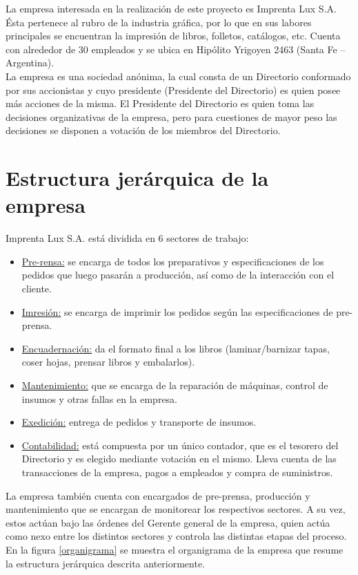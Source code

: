 \documentclass[a4paper, 12pt,twoside]{report}  %
\numberwithin{equation}{subsection} %
\begin{document}
La empresa interesada en la realización de este proyecto es Imprenta Lux S.A. Ésta pertenece al rubro de la industria gráfica, por lo que en sus labores principales se encuentran la impresión de libros, folletos, catálogos, etc. Cuenta con alrededor de 30
empleados y se ubica en Hipólito Yrigoyen 2463 (Santa Fe – Argentina).\\
\indent La empresa es una sociedad anónima, la cual consta de un Directorio conformado por sus
accionistas y cuyo presidente (Presidente del Directorio) es quien posee más acciones de la
misma. El Presidente del Directorio es quien toma las decisiones organizativas de la empresa, pero para cuestiones de mayor peso las decisiones se disponen a votación de los miembros del Directorio.

\section{Estructura jerárquica de la empresa}

Imprenta Lux S.A. está dividida en 6 sectores de trabajo:
\begin{itemize}
\item \underline{Pre-rensa:} se encarga de todos los preparativos y especificaciones de los pedidos que luego pasarán a producción, así como de la interacción con el cliente.
\item \underline{Imresión:} se encarga de imprimir los pedidos según las especificaciones de pre-prensa.
\item \underline{Encuadernación:} da el formato final a los libros (laminar/barnizar tapas, coser hojas, prensar libros y embalarlos).
\item \underline{Mantenimiento:} que se encarga de la reparación de máquinas, control de insumos y otras fallas en la empresa.
\item \underline{Exedición:} entrega de pedidos y transporte de insumos.
\item \underline{Contabilidad:} está compuesta por un único contador, que es el tesorero del Directorio y es elegido mediante votación en el mismo. Lleva cuenta de las transacciones de la empresa, pagos a empleados y compra de suministros.
\end{itemize}
\indent La empresa también cuenta con encargados de pre-prensa, producción y mantenimiento que se
encargan de monitorear los respectivos sectores. A su vez, estos actúan bajo las órdenes del
Gerente general de la empresa, quien actúa como nexo entre los distintos sectores y controla las
distintas etapas del proceso.\\
\indent En la figura \ref{organigrama} se muestra el organigrama de la empresa que resume la estructura jerárquica descrita anteriormente.
\end{document}
